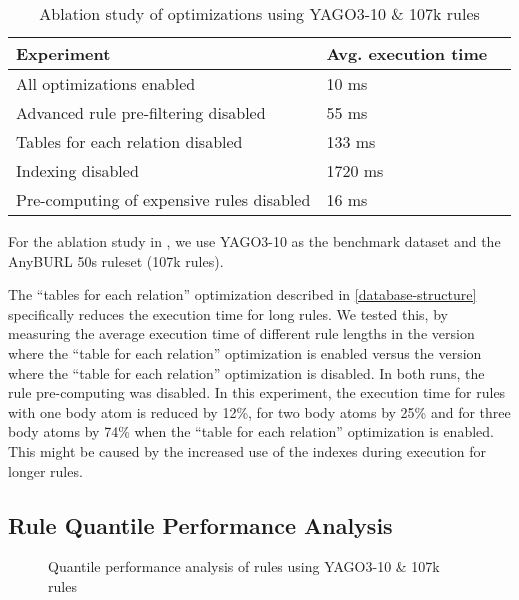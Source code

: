 \documentclass[english]{lni}
\begin{document}
\begin{table}[t]
\centering
\begin{tabular}{lll}
\toprule
Experiment & Avg. execution time \\
\midrule
All optimizations enabled & 10 ms\\
\midrule
Advanced rule pre-filtering disabled & 55 ms\\
Tables for each relation disabled & 133 ms\\
Indexing disabled & 1720 ms\\
Pre-computing of expensive rules disabled & 16 ms\\

\bottomrule
\end{tabular}
\caption{Ablation study of optimizations using YAGO3-10 \& 107k rules}
\label{tab:ablation}
\end{table}


For the ablation study in , we use YAGO3-10 as the benchmark dataset and the AnyBURL 50s ruleset (107k rules). 

The “tables for each relation” optimization described in \ref{database-structure} specifically reduces the execution time for long rules. We tested this, by measuring the average execution time of different rule lengths in the version where the “table for each relation” optimization is enabled versus the version where the “table for each relation” optimization is disabled. In both runs, the rule pre-computing was disabled. In this experiment, the execution time for rules with one body atom is reduced by 12\%, for two body atoms by 25\% and for three body atoms by 74\% when the “table for each relation” optimization is enabled. This might be caused by the increased use of the indexes during execution for longer rules.

\subsection{Rule Quantile Performance Analysis} 

\begin{figure}[t]
\caption{Quantile performance analysis of rules using YAGO3-10 \& 107k rules}
\label{fig:quantile-analysis}
\end{figure}
\end{document}
